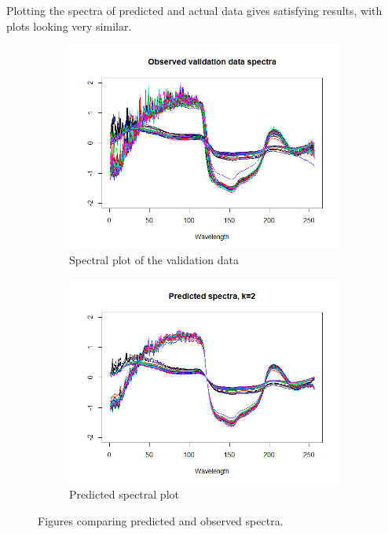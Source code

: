 \documentclass[12pt]{article}
\begin{document}
Plotting the spectra of predicted and actual data gives satisfying results, with plots looking very similar.
\begin{figure}[h!]
  \begin{subfigure}[b]{0.5\linewidth}
      \centering
      \includegraphics[width=\textwidth]{../images/project1/validDataSpectra.png}
   \caption{Spectral plot of the validation data}\label{fig:validDataSpectra}
  \end{subfigure}%
  \begin{subfigure}[b]{0.5\linewidth}
      \centering
   \includegraphics[width=\textwidth]{../images/project1/predictedSpectra.png}
   \caption{Predicted spectral plot}\label{fig:predictedSpectra}
  \end{subfigure}%
 \caption{Figures comparing predicted and observed spectra.}
\end{figure}
\end{document}
